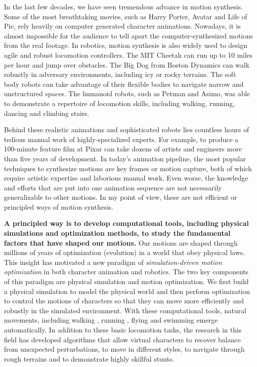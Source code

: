 In the last few decades, we have seen tremendous advance in motion synthesis. Some of the most breathtaking movies, such as Harry Porter, Avatar and Life of Pie, rely heavily on computer generated character animations. Nowadays, it is almost impossible for the audience to tell apart the computer-synthesized motions from the real footage. In robotics, motion synthesis is also widely used to design agile and robust locomotion controllers. The MIT Cheetah can run up to 10 miles per hour and jump over obstacles. The Big Dog from Boston Dynamics can walk robustly in adversary environments, including icy or rocky terrains. The soft body robots can take advantage of their flexible bodies to navigate narrow and unstructured spaces. The humanoid robots, such as Petman and Asimo, was able to demonstrate a repertoire of locomotion skills, including walking, running, dancing and climbing stairs.

Behind these realistic animations and sophisticated robots lies countless hours of tedious manual work of highly-specialized experts. For example, to produce a 100-minute feature film at Pixar can take dozens of artists and engineers more than five years of development. In today's animation pipeline, the most popular techniques to synthesize motions are key frames or motion capture, both of which require artistic expertise and laborious manual work. Even worse, the knowledge and efforts that are put into one animation sequence are not necessarily generalizable to other motions. In my point of view, these are not efficient or principled ways of motion synthesis.

\textbf{A principled way is to develop computational tools, including physical simulations and optimization methods, to study the fundamental factors that have shaped our motions.} Our motions are shaped through millions of years of optimization (evolution) in a world that obey physical laws. This insight has motivated a new paradigm of \emph{simulation-driven motion optimization} in both character animation and robotics. The two key components of this paradigm are physical simulation and motion optimization. We first build a physical simulation to model the physical world and then perform optimization to control the motions of characters so that they can move more efficiently and robustly in the simulated environment. With these computational tools, natural movements, including walking \cite{}, running \cite{}, flying \cite{} and swimming \cite{} emerge automatically. In addition to these basic locomotion tasks, the research in this field has developed algorithms that allow virtual characters to recover balance from unexpected perturbations, to move in different styles, to navigate through rough terrains and to demonstrate highly skillful stunts.

